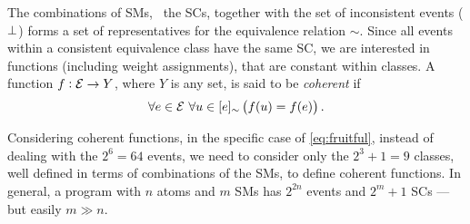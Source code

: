 \documentclass[x11names]{tlp}
\begin{document}
The combinations of \aclp{SM}, \ie~the \aclp{SC}, together with the set of inconsistent events ($\bot$) forms a set of representatives for the equivalence relation $\sim$.
Since all events within a consistent equivalence class have the same \acl{SC}, we are interested in functions (including weight assignments), that are constant within classes.
A function $f:{\mathcal{E}}\to Y$, where $Y$ is any set, is said to be \emph{coherent} if
\begin{equation}
	\forall e\in \EVENTSset~\forall u\in \class{e} \left( f\at{u} = f\at{e} \right).
\end{equation}

Considering coherent functions, in the specific case of \cref{eq:fruitful}, instead of dealing with the $2^6 = 64$ events, we need to consider only the
$2^3 + 1 = 9$ classes, well defined in terms of combinations of the \aclp{SM}, to define coherent functions.
In general, a program with $n$ atoms and $m$ \aclp{SM} has $2^{2n}$ events and $2^m + 1$ \aclp{SC} --- but easily $m \gg n$.
\end{document}
